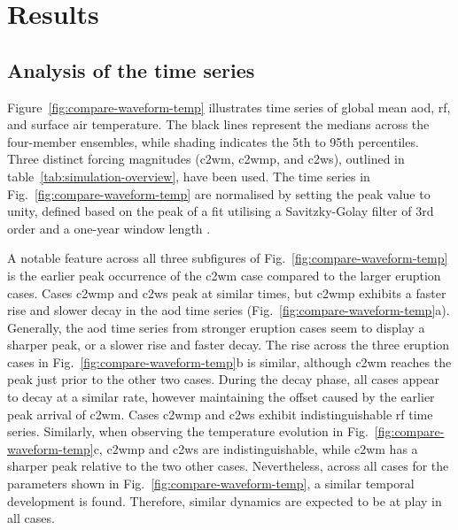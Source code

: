 \documentclass{ametsocV6.1}
\begin{document}
\section{Results}\label{sec:results}


\subsection{Analysis of the time series}

Figure~\ref{fig:compare-waveform-temp} illustrates time series of global mean \gls{aod},
\gls{rf}, and surface air temperature. The black lines represent the medians across the
four-member ensembles, while shading indicates the 5th to 95th percentiles. Three
distinct forcing magnitudes (\gls{c2wm}, \gls{c2wmp}, and \gls{c2ws}), outlined in
table~\ref{tab:simulation-overview}, have been used. The time series in
Fig.~\ref{fig:compare-waveform-temp} are normalised by setting the peak value to unity,
defined based on the peak of a fit utilising a Savitzky-Golay filter of 3rd order and a
one-year window length \citep{savitzky1964}.

A notable feature across all three subfigures of Fig.~\ref{fig:compare-waveform-temp} is
the earlier peak occurrence of the \gls{c2wm} case compared to the larger eruption
cases. Cases \gls{c2wmp} and \gls{c2ws} peak at similar times, but \gls{c2wmp} exhibits
a faster rise and slower decay in the \gls{aod} time series
(Fig.~\ref{fig:compare-waveform-temp}a). Generally, the \gls{aod} time series from
stronger eruption cases seem to display a sharper peak, or a slower rise and faster
decay. The rise across the three eruption cases in Fig.~\ref{fig:compare-waveform-temp}b
is similar, although \gls{c2wm} reaches the peak just prior to the other two cases.
During the decay phase, all cases appear to decay at a similar rate, however maintaining
the offset caused by the earlier peak arrival of \gls{c2wm}. Cases \gls{c2wmp} and
\gls{c2ws} exhibit indistinguishable \gls{rf} time series. Similarly, when observing the
temperature evolution in Fig.~\ref{fig:compare-waveform-temp}c, \gls{c2wmp} and
\gls{c2ws} are indistinguishable, while \gls{c2wm} has a sharper peak relative to the
two other cases. Nevertheless, across all cases for the parameters shown in
Fig.~\ref{fig:compare-waveform-temp}, a similar temporal development is found.
Therefore, similar dynamics are expected to be at play in all cases.
\end{document}
